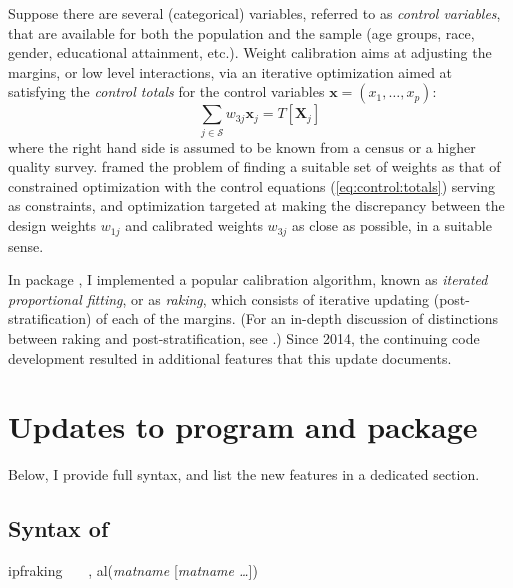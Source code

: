 Suppose there are several (categorical) variables, referred to
as {\it control variables}, that are available for both
the population and the sample
(age groups, race, gender, educational attainment, etc.).
Weight calibration aims at adjusting the margins, or low level interactions,
via an iterative optimization aimed at satisfying
the {\it control totals} for the control variables $\mathbf{x}=(x_1, \ldots, x_p)$:
\begin{equation}
    \sum_{j \in \mathcal{S}} w_{3j} \mathbf{x}_j
    = T [ \mathbf{X}_j  ]
    \label{eq:control:totals}
\end{equation}
where the right hand side is assumed to be known from a census or
a higher quality survey.
\citet{deville:sarndal:1992} framed the problem of finding a suitable
set of weights as that of constrained optimization with the control
equations (\ref{eq:control:totals}) serving as constraints,
and optimization targeted at making the discrepancy between
the design weights $w_{1j}$ and calibrated weights
$w_{3j}$ as close as possible, in a suitable sense.

In package  \citep{kolenikov:2014}, I implemented
a popular calibration algorithm, known as \textit{iterated proportional fitting},
or as \textit{raking}, which consists of iterative updating (post-stratification) of
each of the margins. (For an in-depth discussion of distinctions between
raking and post-stratification, see \citet{kolenikov:2016}.)
Since 2014, the continuing code development resulted
in additional features that this update documents.

\section{Updates to  program and package}

Below, I provide full syntax, and list the new features in a dedicated section.

\subsection{Syntax of }
\label{subsec:syntax}

\begin{stsyntax}
ipfraking
\optif\
\optin\
\optweight\
,
al({\it matname} [{\it matname \ldots}])
\end{stsyntax}

